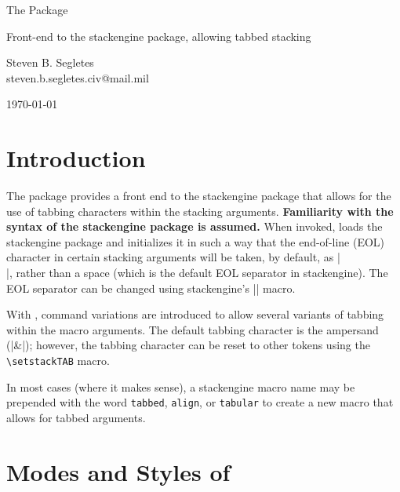 \documentclass{article}
\def\ste{\textsf{stackengine}}   \def\loi{\textsf{listofitems}}
\begin{document}
\begin{center} \LARGE The {\tst} Package\\ \rule{0em}{.7em}\small
Front-end to the {\ste} package, allowing tabbed stacking\\ \rule{0em}{2.7em}\large
Steven B. Segletes\\ steven.b.segletes.civ@mail.mil\\
\rule{0em}{1.7em}\today\\ \tabstackengineversionnumber \end{center}

\tableofcontents

\section{Introduction}

The {\tst} package provides a front end to the {\ste} package that
allows for the use of tabbing characters within the stacking arguments.
\textbf{Familiarity with the syntax of the {\ste} package is assumed.}
When invoked, {\tst} loads the {\ste} package and initializes it in
such a way that the end-of-line (EOL)
character in certain stacking arguments will be taken, by default, 
as \vb|\\|, rather
than a space (which is the default EOL separator in \ste).
The EOL separator can be changed using \ste{}'s \vb|\setstackEOL| macro.

With \tst, command variations are introduced to allow several variants
of tabbing within the macro arguments. The default tabbing character is
the ampersand (\vb|&|); however, the tabbing character can be reset to
other tokens using the \verb|\setstackTAB| macro.

\begin{sloppypar}
In most cases (where it makes sense), a {\ste} macro name may be
prepended with the word \texttt{tabbed}, \texttt{align}, or
\texttt{tabular} to create a new {\tst} macro that allows for tabbed
arguments.
\end{sloppypar}

\section{Modes and Styles of \tst}
\end{document}
